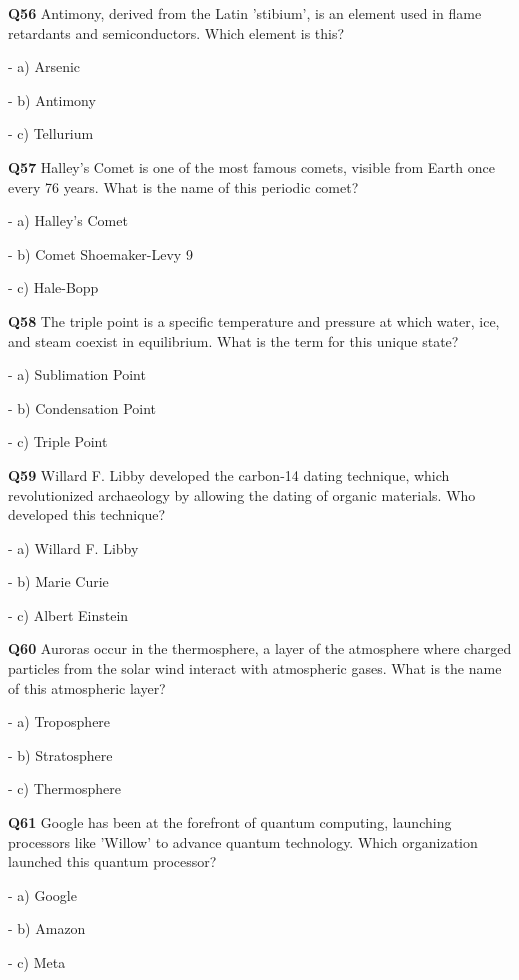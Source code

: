 \textbf{Q56} Antimony, derived from the Latin 'stibium', is an element used in flame retardants and semiconductors. Which element is this?\par
\quad - a) Arsenic\par
\quad - b) Antimony\par
\quad - c) Tellurium\par

\textbf{Q57} Halley's Comet is one of the most famous comets, visible from Earth once every 76 years. What is the name of this periodic comet?\par
\quad - a) Halley's Comet\par
\quad - b) Comet Shoemaker-Levy 9\par
\quad - c) Hale-Bopp\par

\textbf{Q58} The triple point is a specific temperature and pressure at which water, ice, and steam coexist in equilibrium. What is the term for this unique state?\par
\quad - a) Sublimation Point\par
\quad - b) Condensation Point\par
\quad - c) Triple Point\par

\textbf{Q59} Willard F. Libby developed the carbon-14 dating technique, which revolutionized archaeology by allowing the dating of organic materials. Who developed this technique?\par
\quad - a) Willard F. Libby\par
\quad - b) Marie Curie\par
\quad - c) Albert Einstein\par

\textbf{Q60} Auroras occur in the thermosphere, a layer of the atmosphere where charged particles from the solar wind interact with atmospheric gases. What is the name of this atmospheric layer?\par
\quad - a) Troposphere\par
\quad - b) Stratosphere\par
\quad - c) Thermosphere\par

\textbf{Q61} Google has been at the forefront of quantum computing, launching processors like 'Willow' to advance quantum technology. Which organization launched this quantum processor?\par
\quad - a) Google\par
\quad - b) Amazon\par
\quad - c) Meta\par

